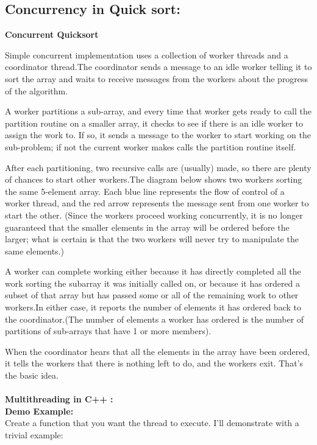 \documentclass{article}
\begin{document}
	\subsection{Concurrency in Quick sort:}
	\textbf{Concurrent Quicksort} \\
	\par	Simple concurrent implementation uses a collection of worker threads and a coordinator thread.The coordinator sends a message to an idle worker telling it to sort the array and waits to receive messages from the workers about the progress of the algorithm. \par
	A worker partitions a sub-array, and every time that worker gets ready to call the partition routine on a smaller array, it checks to see if there is an idle worker to assign the work to. If so, it sends a message to the worker to start working on the sub-problem; if not the current worker makes calls the partition routine itself.
	\par	After each partitioning, two recursive calls are (usually) made, so there are plenty of chances to start other workers.The diagram below shows two workers sorting the same 5-element array. Each blue line represents the flow of control of a worker thread, and the red arrow represents the message sent from one worker to start the other. (Since the workers proceed working concurrently, it is no longer guaranteed that the smaller elements in the array will be ordered before the larger; what is certain is that the two workers will never try to manipulate the same elements.)
	\par	A worker can complete working either because it has directly completed all the work sorting the subarray it was initially called on, or because it has ordered a subset of that array but has passed some or all of the remaining work to other workers.In either case, it reports the number of elements it has ordered back to the coordinator.(The number of elements a worker has ordered is the number of partitions of sub-arrays that have 1 or more members).
	\par	When the coordinator hears that all the elements in the array have been ordered, it tells the workers that there is nothing left to do, and the workers exit. That’s the basic idea.\\\\
	\textbf{Multithreading in C++ :}\\
	\textbf{Demo Example:} \\
	Create a function that you want the thread to execute. I'll demonstrate with a trivial example:\\
\end{document}
